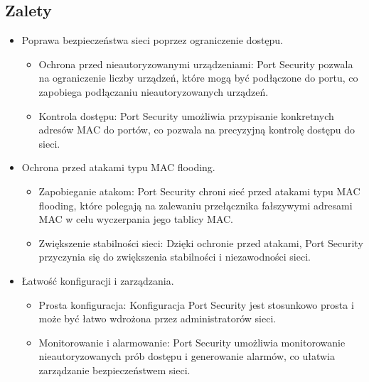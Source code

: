 \subsection{Zalety}
\begin{itemize}
    \item Poprawa bezpieczeństwa sieci poprzez ograniczenie dostępu.
    \begin{itemize}
        \item Ochrona przed nieautoryzowanymi urządzeniami: Port Security pozwala na ograniczenie liczby urządzeń, które mogą być podłączone do portu, co zapobiega podłączaniu nieautoryzowanych urządzeń.
        \item Kontrola dostępu: Port Security umożliwia przypisanie konkretnych adresów MAC do portów, co pozwala na precyzyjną kontrolę dostępu do sieci.
    \end{itemize}
    \item Ochrona przed atakami typu MAC flooding.
    \begin{itemize}
        \item Zapobieganie atakom: Port Security chroni sieć przed atakami typu MAC flooding, które polegają na zalewaniu przełącznika fałszywymi adresami MAC w celu wyczerpania jego tablicy MAC.
        \item Zwiększenie stabilności sieci: Dzięki ochronie przed atakami, Port Security przyczynia się do zwiększenia stabilności i niezawodności sieci.
    \end{itemize}
    \item Łatwość konfiguracji i zarządzania.
    \begin{itemize}
        \item Prosta konfiguracja: Konfiguracja Port Security jest stosunkowo prosta i może być łatwo wdrożona przez administratorów sieci.
        \item Monitorowanie i alarmowanie: Port Security umożliwia monitorowanie nieautoryzowanych prób dostępu i generowanie alarmów, co ułatwia zarządzanie bezpieczeństwem sieci.
    \end{itemize}
\end{itemize}

